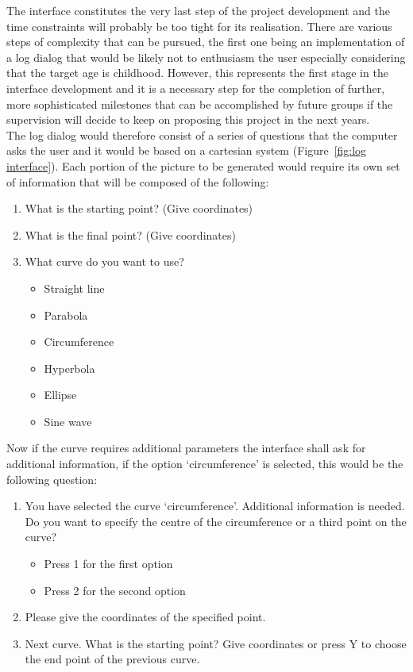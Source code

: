     The interface constitutes the very last step of the project development and the time constraints will probably be too tight for its realisation. There are various steps of complexity that can be pursued, the first one being an implementation of a log dialog that would be likely not to enthusiasm the user especially considering that the target age is childhood. However, this represents the first stage in the interface development and it is a necessary step for the completion of further, more sophisticated milestones that can be accomplished by future groups if the supervision will decide to keep on proposing this project in the next years.\\
    The log dialog would therefore consist of a series of questions that the computer asks the user and it would be based on a cartesian system (Figure~\ref{fig:log interface}). Each portion of the picture to be generated would require its own set of information that will be composed of the following:
    \begin{enumerate}
        \item What is the starting point? (Give coordinates)
        \item What is the final point? (Give coordinates)
        \item What curve do you want to use?
        \begin{itemize}
            \item Straight line
            \item Parabola
            \item Circumference
            \item Hyperbola
            \item Ellipse
            \item Sine wave
        \end{itemize}
    \end{enumerate}
    Now if the curve requires additional parameters the interface shall ask for additional information, \eg if the option `circumference' is selected, this would be the following question:
    \begin{enumerate}[resume]
        \item You have selected the curve `circumference'. Additional information is needed. Do you want to specify the centre of the circumference or a third point on the curve?
        \begin{itemize}
            \item Press 1 for the first option
            \item Press 2 for the second option
        \end{itemize}
        \item Please give the coordinates of the specified point.
        \item Next curve. What is the starting point? Give coordinates or press Y to choose the end point of the previous curve.
    \end{enumerate}
